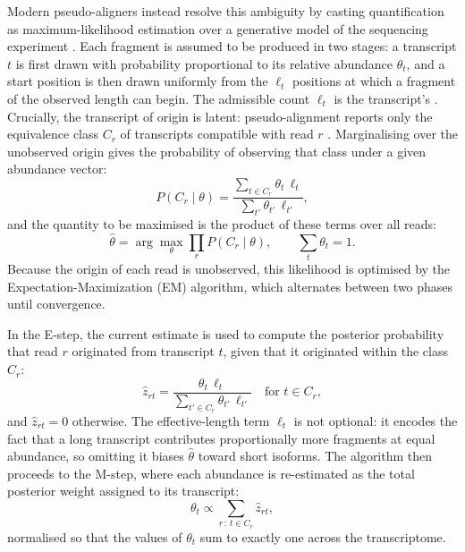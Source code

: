Modern pseudo-aligners instead resolve this ambiguity by casting quantification as maximum-likelihood estimation over a generative model of the sequencing experiment \cite{patro2017salmon}. Each fragment is assumed to be produced in two stages: a transcript $t$ is first drawn with probability proportional to its relative abundance $\theta_t$, and a start position is then drawn uniformly from the $\ell_t$ positions at which a fragment of the observed length can begin. The admissible count $\ell_t$ is the transcript's . Crucially, the transcript of origin is latent: pseudo-alignment reports only the equivalence class $C_r$ of transcripts compatible with read $r$ \cite{bray2016near}. Marginalising over the unobserved origin gives the probability of observing that class under a given abundance vector:
$$ P(C_r \mid \theta) = \frac{\sum_{t \in C_r} \theta_t \, \ell_t}{\sum_{t'} \theta_{t'} \, \ell_{t'}}, $$
and the quantity to be maximised is the product of these terms over all reads:
$$ \hat{\theta} = \arg\max_{\theta} \prod_{r} P(C_r \mid \theta), \qquad \sum_{t} \theta_t = 1. $$
Because the origin of each read is unobserved, this likelihood is optimised by the Expectation-Maximization (EM) algorithm, which alternates between two phases until convergence.

In the E-step, the current estimate is used to compute the posterior probability that read $r$ originated from transcript $t$, given that it originated within the class $C_r$:
$$ \hat{z}_{rt} = \frac{\theta_t \, \ell_t}{\sum_{t' \in C_r} \theta_{t'} \, \ell_{t'}} \quad \text{for } t \in C_r, $$
and $\hat{z}_{rt} = 0$ otherwise. The effective-length term $\ell_t$ is not optional: it encodes the fact that a long transcript contributes proportionally more fragments at equal abundance, so omitting it biases $\hat{\theta}$ toward short isoforms. The algorithm then proceeds to the M-step, where each abundance is re-estimated as the total posterior weight assigned to its transcript:
$$ \theta_t \propto \sum_{r \,:\, t \in C_r} \hat{z}_{rt}, $$
normalised so that the values of $\theta_t$ sum to exactly one across the transcriptome.

